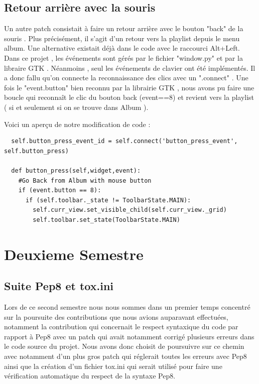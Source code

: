 \documentclass[12pt]{report}
\begin{document}
\subsection{Retour arrière avec la souris}
Un autre patch consistait à faire un retour arrière avec le bouton
"back" de la souris . Plus précisément, il s'agit d'un retour vers la
playlist depuis le menu album.  Une alternative existait déjà dans le
code avec le raccourci Alt+Left. Dans ce projet , les événements sont
gérés par le fichier "window.py" et par la libraire GTK . Néanmoins ,
seul les événements de clavier ont été implémentés. Il a donc fallu
qu'on connecte la reconnaissance des clics avec un ".connect" . Une
fois le "event.button" bien reconnu par la librairie GTK , nous avons
pu faire une boucle qui reconnaît le clic du bouton back (event==8) et
revient vers la playlist ( si et seulement si on se trouve dans Album
).

Voici un aperçu de notre modification de code : 

\begin{verbatim}
  self.button_press_event_id = self.connect('button_press_event', self.button_press)

  def button_press(self,widget,event):
    #Go Back from Album with mouse button 
    if (event.button == 8):
      if (self.toolbar._state != ToolbarState.MAIN):
        self.curr_view.set_visible_child(self.curr_view._grid)
        self.toolbar.set_state(ToolbarState.MAIN)
\end{verbatim}

\section{Deuxieme Semestre}
\subsection{Suite Pep8 et tox.ini}
Lors de ce second semestre nous nous sommes dans un premier temps concentré sur la poursuite des contributions que nous avions auparavant effectuées, notamment la contribution qui concernait le respect syntaxique du code par rapport à Pep8 avec un patch qui avait notamment corrigé plusieurs erreurs dans le code source du projet. Nous avons donc choisit de poursuivre sur ce chemin avec notamment d’un plus gros patch qui réglerait toutes les erreurs avec Pep8 ainsi que la création d’un fichier tox.ini qui serait utilisé pour faire une vérification automatique du respect de la syntaxe Pep8.
\end{document}
